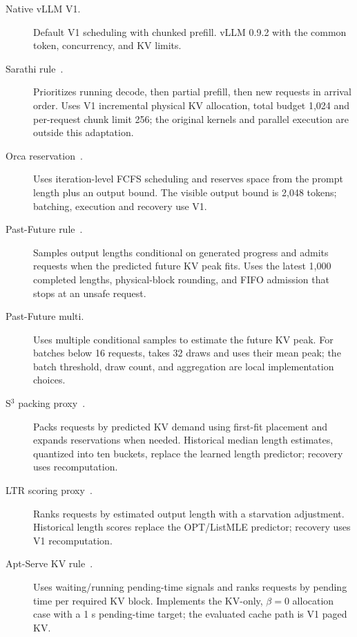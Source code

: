 \begin{description}
\item[Native vLLM V1.] Default V1 scheduling with chunked prefill.
vLLM 0.9.2 with the common token, concurrency, and KV limits.

\item[Sarathi rule~\cite{intro_sarathi}.] Prioritizes running decode, then partial prefill, then new requests in arrival order.
Uses V1 incremental physical KV allocation, total budget 1,024 and per-request chunk limit 256; the original kernels and parallel execution are outside this adaptation.

\item[Orca reservation~\cite{intro_orca}.] Uses iteration-level FCFS scheduling and reserves space from the prompt length plus an output bound.
The visible output bound is 2,048 tokens; batching, execution and recovery use V1.

\item[Past-Future rule~\cite{intro_pastfuture}.] Samples output lengths conditional on generated progress and admits requests when the predicted future KV peak fits.
Uses the latest 1,000 completed lengths, physical-block rounding, and FIFO admission that stops at an unsafe request.

\item[Past-Future multi.] Uses multiple conditional samples to estimate the future KV peak.
For batches below 16 requests, takes 32 draws and uses their mean peak; the batch threshold, draw count, and aggregation are local implementation choices.

\item[S$^3$ packing proxy~\cite{intro_s3}.] Packs requests by predicted KV demand using first-fit placement and expands reservations when needed.
Historical median length estimates, quantized into ten buckets, replace the learned length predictor; recovery uses recomputation.

\item[LTR scoring proxy~\cite{intro_ltr}.] Ranks requests by estimated output length with a starvation adjustment.
Historical length scores replace the OPT/ListMLE predictor; recovery uses V1 recomputation.

\item[Apt-Serve KV rule~\cite{intro_aptserve}.] Uses waiting/running pending-time signals and ranks requests by pending time per required KV block.
Implements the KV-only, $\beta=0$ allocation case with a 1 s pending-time target; the evaluated cache path is V1 paged KV.


\end{description}
